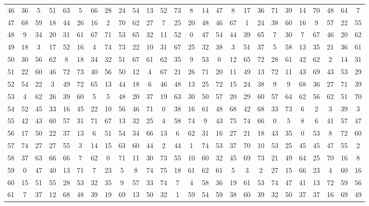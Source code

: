 \begin{table}
\begin{tabular}{c c c c c c c c c c c c c c c c c c c c c c c c c c }
46 & 36 & 5 & 51 & 63 & 5 & 66 & 28 & 24 & 54 & 13 & 52 & 73 & 8 & 14 & 47 & 8 & 17 & 36 & 71 & 39 & 14 & 70 & 48 & 64 & 7 \\
47 & 68 & 59 & 18 & 44 & 26 & 16 & 2 & 70 & 62 & 27 & 7 & 25 & 20 & 48 & 46 & 67 & 1 & 24 & 38 & 60 & 16 & 9 & 57 & 22 & 55 \\
48 & 9 & 34 & 20 & 31 & 61 & 67 & 71 & 53 & 65 & 32 & 11 & 52 & 0 & 47 & 54 & 44 & 39 & 65 & 7 & 30 & 7 & 67 & 46 & 20 & 62 \\
49 & 18 & 3 & 17 & 52 & 16 & 4 & 74 & 73 & 22 & 10 & 31 & 67 & 25 & 32 & 38 & 3 & 51 & 37 & 5 & 58 & 13 & 35 & 21 & 36 & 61 \\
50 & 30 & 56 & 62 & 8 & 18 & 34 & 32 & 51 & 67 & 61 & 62 & 35 & 9 & 53 & 0 & 12 & 65 & 72 & 28 & 61 & 42 & 62 & 2 & 14 & 31 \\
51 & 22 & 60 & 46 & 72 & 73 & 40 & 56 & 50 & 12 & 4 & 67 & 21 & 26 & 71 & 20 & 11 & 49 & 13 & 72 & 11 & 43 & 69 & 43 & 53 & 29 \\
52 & 54 & 22 & 3 & 49 & 72 & 65 & 13 & 44 & 18 & 6 & 46 & 48 & 13 & 25 & 72 & 15 & 24 & 38 & 9 & 9 & 68 & 36 & 27 & 71 & 39 \\
53 & 4 & 62 & 26 & 39 & 60 & 5 & 5 & 48 & 20 & 37 & 19 & 63 & 30 & 50 & 57 & 20 & 29 & 60 & 57 & 64 & 62 & 56 & 62 & 51 & 70 \\
54 & 52 & 45 & 33 & 16 & 45 & 22 & 10 & 56 & 46 & 71 & 0 & 38 & 16 & 61 & 48 & 68 & 42 & 68 & 33 & 73 & 6 & 2 & 3 & 39 & 3 \\
55 & 42 & 43 & 60 & 57 & 31 & 71 & 67 & 13 & 32 & 25 & 4 & 58 & 74 & 9 & 43 & 75 & 74 & 66 & 0 & 5 & 8 & 6 & 41 & 57 & 47 \\
56 & 17 & 50 & 22 & 37 & 13 & 6 & 51 & 54 & 34 & 66 & 13 & 6 & 62 & 31 & 16 & 27 & 21 & 18 & 43 & 35 & 0 & 53 & 8 & 72 & 60 \\
57 & 74 & 27 & 27 & 55 & 3 & 14 & 15 & 63 & 60 & 44 & 2 & 44 & 1 & 74 & 53 & 37 & 70 & 10 & 53 & 25 & 45 & 45 & 47 & 55 & 2 \\
58 & 37 & 63 & 66 & 66 & 7 & 62 & 0 & 71 & 11 & 30 & 73 & 55 & 10 & 60 & 32 & 45 & 69 & 73 & 21 & 49 & 64 & 25 & 70 & 16 & 8 \\
59 & 0 & 47 & 40 & 13 & 71 & 7 & 23 & 5 & 8 & 74 & 75 & 18 & 61 & 62 & 61 & 5 & 3 & 2 & 27 & 15 & 66 & 23 & 4 & 60 & 16 \\
60 & 15 & 51 & 55 & 28 & 53 & 32 & 35 & 9 & 57 & 33 & 74 & 7 & 4 & 58 & 36 & 19 & 61 & 53 & 74 & 47 & 41 & 13 & 72 & 59 & 56 \\
61 & 7 & 37 & 12 & 68 & 48 & 39 & 19 & 69 & 13 & 50 & 32 & 1 & 59 & 54 & 59 & 38 & 60 & 39 & 32 & 50 & 37 & 37 & 16 & 69 & 49 \\

\end{tabular}
\end{table}
